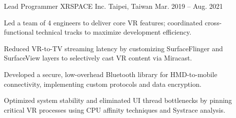 \begin{cventries}
  \cventry
    {Lead Programmer} %
    {XRSPACE Inc.} %
    {Taipei, Taiwan} %
    {Mar. 2019 -- Aug. 2021} %
    {
      \begin{cvitems} %
	\item {Led a team of 4 engineers to deliver core VR features; coordinated cross-functional technical tracks to maximize development efficiency.}
        \item {Reduced VR-to-TV streaming latency by customizing SurfaceFlinger and SurfaceView layers to selectively cast VR content via Miracast.}
        \item {Developed a secure, low-overhead Bluetooth library for HMD-to-mobile connectivity, implementing custom protocols and data encryption.}
        \item {Optimized system stability and eliminated UI thread bottlenecks by pinning critical VR processes using CPU affinity techniques and Systrace analysis.}
      \end{cvitems}
    }


\end{cventries}
